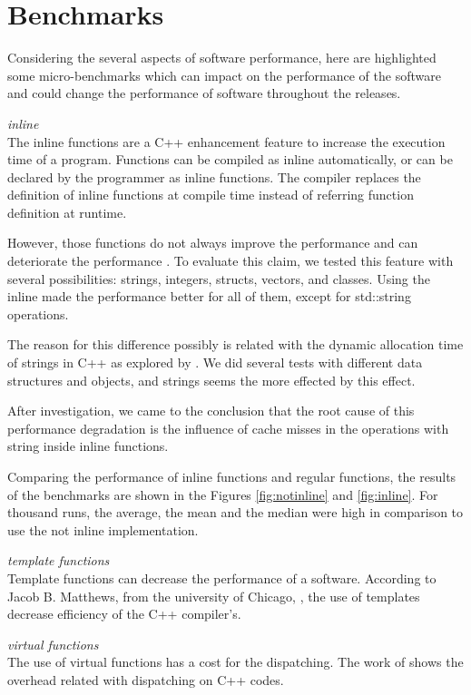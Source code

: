 \section{Benchmarks}
    Considering the several aspects of software performance, here are highlighted some micro-benchmarks which can impact on the performance of the software and could change the performance of software throughout the releases.
    
    \textit{inline}\\
    The inline functions are a C++ enhancement feature to increase the execution time of a program. Functions can be compiled as inline automatically, or can be declared by the programmer as inline functions. The compiler replaces the definition of inline functions at compile time instead of referring function definition at runtime.
    
    However, those functions do not always improve the performance and can deteriorate the performance \cite{inline_site}. To evaluate this claim, we tested this feature with several possibilities: strings, integers, structs, vectors, and classes. Using the inline made the performance better for all of them, except for std::string operations. 
    
    The reason for this difference possibly is related with the dynamic allocation time of strings in C++ as explored by \cite{optc++}. We did several tests with different data structures and objects, and strings seems the more effected by this effect.
    
    After investigation, we came to the conclusion that the root cause of this performance degradation is the influence of cache misses in the operations with string inside inline functions.
    
    Comparing the performance of inline functions and regular functions, the results of the benchmarks are shown in the Figures \ref{fig:notinline} and \ref{fig:inline}. For thousand runs, the average, the mean and the median were high in comparison to use the not inline implementation.
    
    \textit{template functions} \\
     Template functions can decrease the performance of a software.
     According to Jacob B. Matthews, from the university of Chicago, \cite{chicago}, the use of templates decrease efficiency of the C++ compiler's.
     
     
    \textit{virtual functions} \\
     The use of virtual functions has a cost for the dispatching. The work of \cite{dispatch} shows the overhead related with dispatching on C++ codes.
     

